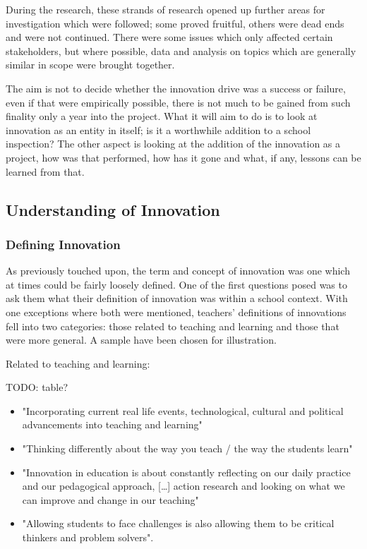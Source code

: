 During the research, these strands of research opened up further areas for investigation which were followed; some proved fruitful, others were dead ends and were not continued. There were some issues which only affected certain stakeholders, but where possible, data and analysis on topics which are generally similar in scope were brought together.

The aim is not to decide whether the innovation drive was a success or failure, even if that were empirically possible, there is not much to be gained from such finality only a year into the project. What it will aim to do is to look at innovation as an entity in itself; is it a worthwhile addition to a school inspection? The other aspect is looking at the addition of the innovation as a project, how was that performed, how has it gone and what, if any, lessons can be learned from that.

\subsection{Understanding of Innovation}
\subsubsection{Defining Innovation}
As previously touched upon, the term and concept of innovation was one which at times could be fairly loosely defined. One of the first questions posed was to ask them what their definition of innovation was within a school context. With one exceptions where both were mentioned, teachers' definitions of innovations fell into two categories: those related to teaching and learning and those that were more general. A sample have been chosen for illustration.

Related to teaching and learning: 

TODO: table?

\begin{itemize}
\item "Incorporating current real life events, technological, cultural and political advancements into teaching and learning"
\item "Thinking differently about the way you teach / the way the students learn"
\item "Innovation in education is about constantly reflecting on our daily practice and our pedagogical approach, […] action research and looking on what we can improve and change in our teaching"
\item "Allowing students to face challenges is also allowing them to be critical thinkers and problem solvers".
\end{itemize}

